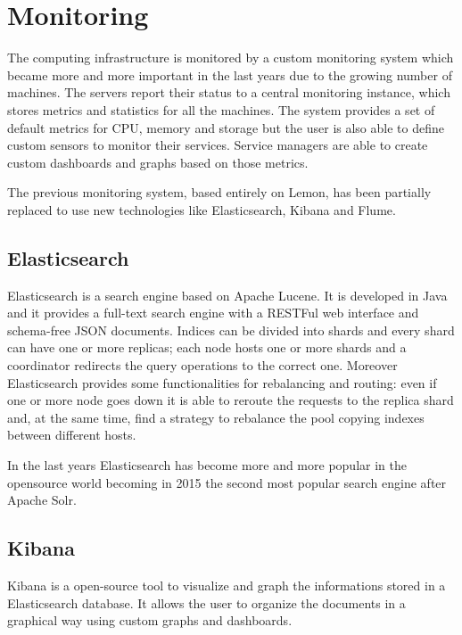 \section{Monitoring}

The computing infrastructure is monitored by a custom monitoring system
which became more and more important in the last years due to the growing
number of machines. The servers report their status to a central
monitoring instance, which stores metrics and statistics for all the
machines. The system provides a set of default metrics for CPU, memory and
storage but the user is also able to define custom sensors to monitor
their services. Service managers are able to create custom dashboards and
graphs based on those metrics.

The previous monitoring system, based entirely on Lemon, has been
partially replaced to use new technologies like Elasticsearch, Kibana and
Flume. 

\subsection{Elasticsearch}

Elasticsearch is a search engine based on Apache Lucene. It is developed
in Java and it provides a full-text search engine with a RESTFul web
interface and schema-free JSON documents. Indices can be divided into
shards and every shard can have one or more replicas; each node hosts one
or more shards and a coordinator redirects the query operations to the
correct one. Moreover Elasticsearch provides some functionalities for
rebalancing and routing: even if one or more node goes down it is able to
reroute the requests to the replica shard and, at the same time, find
a strategy to rebalance the pool copying indexes between different
hosts.

In the last years Elasticsearch has become more and more popular in the
opensource world becoming in 2015 the second most popular search engine
after Apache Solr.

\subsection{Kibana}

Kibana is a open-source tool to visualize and graph the informations
stored in a Elasticsearch database. It allows the user to organize the
documents in a graphical way using custom graphs and dashboards.



